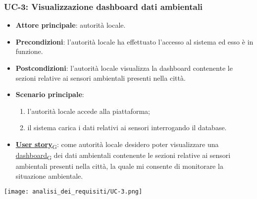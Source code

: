 \subsubsection{UC-3: Visualizzazione dashboard dati ambientali}
\begin{itemize}
	\item \textbf{Attore principale}: autorità locale.
	\item \textbf{Precondizioni}: l'autorità locale ha effettuato l'accesso al sistema ed esso è in funzione.
	\item \textbf{Postcondizioni}: l'autorità locale visualizza la dashboard contenente le sezioni relative ai sensori ambientali presenti nella città.
	\item \textbf{Scenario principale}:
	      \begin{enumerate}
		      \item l'autorità locale accede alla piattaforma;
		      \item il sistema carica i dati relativi ai sensori interrogando il database.
	      \end{enumerate}
	\item \href{https://7last.github.io/docs/pb/documentazione-interna/glossario\#user-story}{\textbf{User story}\textsubscript{G}}: come autorità locale desidero poter visualizzare una \href{https://7last.github.io/docs/pb/documentazione-interna/glossario\#dashboard}{dashboard\textsubscript{G}} dei dati ambientali contenente le sezioni relative ai sensori ambientali presenti nella città, la quale mi consente di monitorare la situazione ambientale.
\end{itemize}
\begin{center}
	\texttt{[image: analisi\_dei\_requisiti/UC-3.png]}
\end{center}


